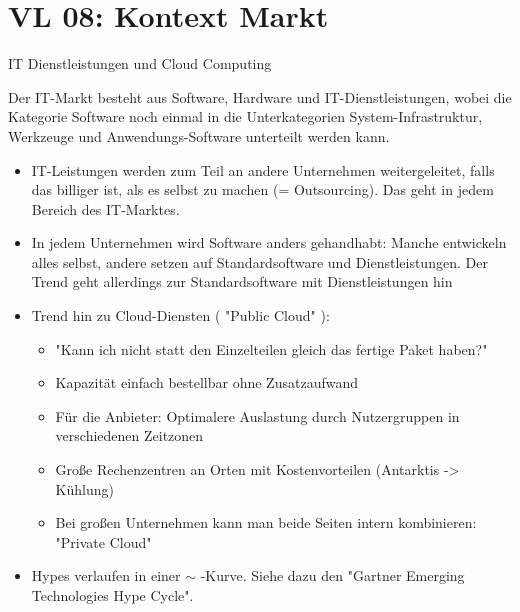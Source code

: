 \section{VL 08: Kontext Markt}
IT Dienstleistungen und Cloud Computing

Der IT-Markt besteht aus Software, Hardware und IT-Dienstleistungen, wobei die Kategorie Software noch einmal in die Unterkategorien System-Infrastruktur, Werkzeuge und Anwendungs-Software unterteilt werden kann.

\begin{itemize}
\item IT-Leistungen werden zum Teil an andere Unternehmen weitergeleitet, falls das billiger ist, als es selbst zu machen (= Outsourcing). Das geht in jedem Bereich des IT-Marktes.
\item In jedem Unternehmen wird Software anders gehandhabt: Manche entwickeln alles selbst, andere setzen auf Standardsoftware und Dienstleistungen. Der Trend geht allerdings zur Standardsoftware mit Dienstleistungen hin
\item Trend hin zu Cloud-Diensten ( "Public Cloud" ): 
\begin{itemize}
\item "Kann ich nicht statt den Einzelteilen gleich das fertige Paket haben?"
\item Kapazität einfach bestellbar ohne Zusatzaufwand
\item Für die Anbieter: Optimalere Auslastung durch Nutzergruppen in verschiedenen Zeitzonen
\item Große Rechenzentren an Orten mit Kostenvorteilen (Antarktis -> Kühlung)
\item Bei großen Unternehmen kann man beide Seiten intern kombinieren: "Private Cloud"
\end{itemize}
\item Hypes verlaufen in einer $\sim$ -Kurve. Siehe dazu den "Gartner Emerging Technologies Hype Cycle".

\end{itemize}